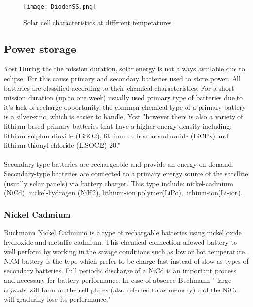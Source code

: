 \begin{figure}[h]
	\centering
	\texttt{[image: DiodenSS.png]}
	\caption{ Solar cell characteristics at different temperatures}
	\label{fig: EPS}
\end{figure}
 
\newpage


\subsection{Power storage \label{sec:tech}}



Yost\cite{1} During the the mission duration, solar energy is not always available due to eclipse. For this cause primary and secondary batteries used to store power. All batteries are classified according to their chemical characteristics. For a short mission duration (up to one week) usually used primary type of batteries due to it's lack of recharge opportunity. the common chemical type of a primary battery is a silver-zinc, which is easier to handle, Yost\cite{1} "however there is also a variety of lithium-based primary batteries that have a higher energy density including: lithium sulphur dioxide (LiSO2), lithium carbon monofluoride (LiCFx) and lithium thionyl chloride (LiSOCl2) 20."\\
\\
Secondary-type batteries are rechargeable and provide an energy on demand. Secondary-type batteries are connected to a primary energy source of the satellite (usually solar panels) via battery charger. This type include: nickel-cadmium (NiCd), nickel-hydrogen (NiH2), lithium-ion polymer(LiPo), lithium-ion(Li-ion).
\subsubsection{Nickel Cadmium \label{sec:tech}}
 Buchmann\cite{7} Nickel Cadmium is a type of rechargable batteries using nickel oxide hydroxide and metallic cadmium. This chemical connection allowed battery to well perform by working in the savage conditions such as low or hot temperature. NiCd battery is the type which prefer to be charge fast instead of slow as types of secondary batteries. Full periodic discharge of a NiCd is an important process and necessary for battery performance. In case of absence  Buchmann\cite{7} " large crystals will form on the cell plates (also referred to as memory) and the NiCd will gradually lose its performance."
 
 \newpage

